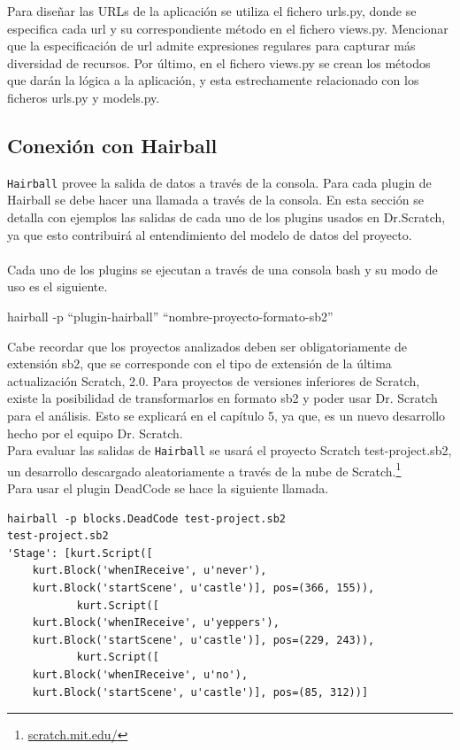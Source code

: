 \documentclass[a4paper, 12pt]{book}
\begin{document}
Para diseñar las URLs de la aplicación se utiliza el fichero urls.py, donde se especifica cada url y
su correspondiente método en el fichero views.py. Mencionar que la especificación de url admite 
expresiones regulares para capturar más diversidad de recursos.
Por último, en el fichero views.py se crean los métodos que darán la lógica a la aplicación, y esta
estrechamente relacionado con los ficheros urls.py y models.py.


\subsection{Conexión con Hairball}
\texttt{Hairball} provee la salida de datos a través de la consola. Para cada plugin de Hairball se 
debe hacer una llamada a través de la consola. En esta sección se detalla con ejemplos las salidas 
de cada uno de los plugins usados en Dr.Scratch, ya que esto contribuirá al entendimiento del modelo 
de datos del proyecto. \\ \\ 

Cada uno de los plugins se ejecutan a través de una consola bash y su modo de uso es el siguiente.

\begin{center}
hairball -p "`plugin-hairball"' "`nombre-proyecto-formato-sb2"'
\end{center}

Cabe recordar que los proyectos analizados deben ser obligatoriamente de extensión sb2, que se 
corresponde con el tipo de extensión de la última actualización Scratch, 2.0. Para proyectos de 
versiones inferiores de Scratch, existe la posibilidad de transformarlos en formato sb2 y poder
usar Dr. Scratch para el análisis. Esto se explicará en el capítulo 5, ya que, es un nuevo
desarrollo hecho por el equipo Dr. Scratch. \\

Para evaluar las salidas de \texttt{Hairball} se usará el proyecto Scratch test-project.sb2, 
un desarrollo descargado aleatoriamente a través de la nube de 
Scratch.\footnote{\url{scratch.mit.edu/}} \\

Para usar el plugin DeadCode se hace la siguiente llamada.
\begingroup
\fontsize{8pt}{9pt}\selectfont
\begin{verbatim}
hairball -p blocks.DeadCode test-project.sb2 
test-project.sb2 
'Stage': [kurt.Script([ 
    kurt.Block('whenIReceive', u'never'), 
    kurt.Block('startScene', u'castle')], pos=(366, 155)), 
           kurt.Script([  
    kurt.Block('whenIReceive', u'yeppers'), 
    kurt.Block('startScene', u'castle')], pos=(229, 243)), 
           kurt.Script([ 
    kurt.Block('whenIReceive', u'no'), 
    kurt.Block('startScene', u'castle')], pos=(85, 312))] 
\end{verbatim}
\endgroup
\end{document}
